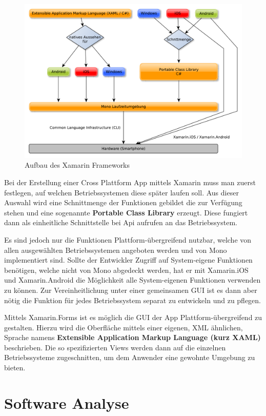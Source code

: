 \begin{figure}[H]
	\centering
	\includegraphics[scale=0.58]{images/Xamarin}
	\caption[Aufbau des Xamarin Frameworks]{Aufbau des Xamarin Frameworks}
	\label{XamarinBild}
\end{figure}

Bei der Erstellung einer Cross Plattform App mittels Xamarin muss man zuerst festlegen, auf welchen Betriebssystemen diese später laufen soll. Aus dieser Auswahl wird eine Schnittmenge der Funktionen gebildet die zur Verfügung stehen und eine sogenannte \textbf{Portable Class Library} erzeugt. Diese fungiert dann als einheitliche Schnittstelle bei Api aufrufen an das Betriebssystem.

Es sind jedoch nur die Funktionen Plattform-übergreifend nutzbar, welche von allen ausgewählten Betriebssystemen angeboten werden und von Mono implementiert sind. 
Sollte der Entwickler Zugriff auf System-eigene Funktionen benötigen, welche nicht von Mono abgedeckt werden, hat er mit Xamarin.iOS und Xamarin.Android die Möglichkeit alle System-eigenen Funktionen verwenden zu können. Zur Vereinheitlichung unter einer gemeinsamen GUI ist es dann aber nötig die Funktion für jedes Betriebssystem separat zu entwickeln und zu pflegen.

Mittels Xamarin.Forms ist es möglich die GUI der App Plattform-übergreifend zu gestalten. Hierzu wird die Oberfläche mittels einer eigenen, XML ähnlichen, Sprache namens \textbf{Extensible Application Markup Language (kurz XAML)} beschrieben. Die so spezifizierten Views werden dann auf die einzelnen Betriebssysteme zugeschnitten, um dem Anwender eine gewohnte Umgebung zu bieten. 

\section{Software Analyse}

